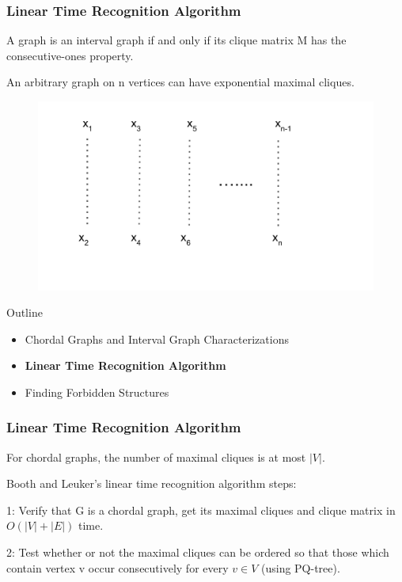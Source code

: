 \documentclass{beamer}
\begin{document}
\begin{frame}
	\frametitle{Linear Time Recognition Algorithm}
	\vspace{0.2in}
	A graph is an interval graph if and only if its clique matrix M has the consecutive-ones property.
	
	\vspace{0.2in}
	
	An arbitrary graph on n vertices can have exponential maximal cliques.
	\begin{figure}
		\includegraphics[width = 1\textwidth,height = 0.5\textheight]{figures/recognition_1.pdf}
	\end{figure}
	
	
\vspace{0.2in}
\end{frame}

\begin{frame}{Outline}
\begin{itemize}
    \item Chordal Graphs and Interval Graph Characterizations
    \vspace{0.2in}
    \item \textbf{Linear Time Recognition Algorithm}
    \vspace{0.2in}
    \item Finding Forbidden Structures
\end{itemize}
\end{frame}

\begin{frame}
	\frametitle{Linear Time Recognition Algorithm}
	
	For chordal graphs, the number of maximal cliques is at most $|V|$.
	
	\vspace{0.2in}
	
	Booth and Leuker's linear time recognition algorithm steps:
	\vspace{0.1in}
	
	1: Verify that G is a chordal graph, get its maximal cliques and clique matrix in $O(|V|+|E|)$ time. 
	
	\vspace{0.2in}
	
	2: Test whether or not the maximal cliques can be ordered so that those which contain vertex v occur consecutively for every $v \in V$ (using PQ-tree).
	
	
\vspace{0.2in}
\end{frame}
\end{document}

